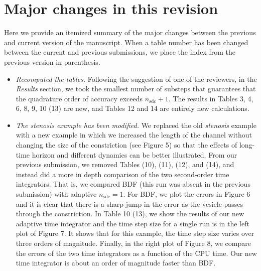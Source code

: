 \documentclass[12pt]{article}
\newcommand{\sdc}{{\mathrm{sdc}}}
\begin{document}
\section*{Major changes in this revision}
Here we provide an itemized summary of the major changes between the
previous and current version of the manuscript. When a table number has
been changed between the current and previous submissions, we place the
index from the previous version in parenthesis.

\begin{itemize}
  \item {\em Recomputed the tables.}  Following the suggestion of one
  of the reviewers, in the {\em Results} section, we took the smallest
  number of substeps that guarantees that the quadrature order of
  accuracy exceeds $n_{\sdc}+1$. The results in Tables 3, 4, 6, 8, 9,
  10 (13) are new, and Tables 12 and 14 are entirely new calculations.

  \item {\em The stenosis example has been modified.}  We replaced the
  old {\em stenosis} example with a new example in which we increased
  the length of the channel without changing the size of the
  constriction (see Figure 5) so that the effects of long-time horizon
  and different dynamics can be better illustrated.  From our previous
  submission, we removed Tables (10), (11), (12), and (14), and instead
  did a more in depth comparison of the two second-order time
  integrators.  That is, we compared BDF (this run was absent in the
  previous submission) with adaptive $n_{\sdc}=1$.  For BDF, we plot
  the errors in Figure 6 and it is clear that there is a sharp jump in
  the error as the vesicle passes through the constriction.  In Table
  10 (13), we show the results of our new adaptive time integrator and
  the time step size for a single run is in the left plot of Figure 7.
  It shows that for this example, the time step size varies over three
  orders of magnitude.  Finally, in the right plot of Figure 8, we
  compare the errors of the two time integrators as a function of the
  CPU time. Our new time integrator is about an order of magnitude
  faster than BDF.

  


\end{itemize}
\end{document}
